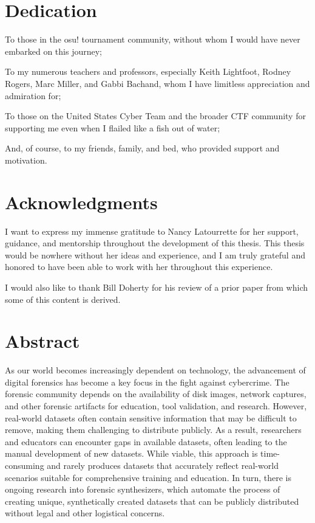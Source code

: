 \section{Dedication}\label{dedication}

To those in the osu! tournament community, without whom I would have
never embarked on this journey;

To my numerous teachers and professors, especially Keith Lightfoot,
Rodney Rogers, Marc Miller, and Gabbi Bachand, whom I have limitless
appreciation and admiration for;

To those on the United States Cyber Team and the broader CTF community
for supporting me even when I flailed like a fish out of water;

And, of course, to my friends, family, and bed, who provided support and
motivation.

\section{Acknowledgments}\label{acknowledgments}

I want to express my immense gratitude to Nancy Latourrette for her
support, guidance, and mentorship throughout the development of this
thesis. This thesis would be nowhere without her ideas and experience,
and I am truly grateful and honored to have been able to work with her
throughout this experience.

I would also like to thank Bill Doherty for his review of a prior paper
from which some of this content is derived.

\section{Abstract}\label{abstract}

As our world becomes increasingly dependent on technology, the
advancement of digital forensics has become a key focus in the fight
against cybercrime. The forensic community depends on the availability
of disk images, network captures, and other forensic artifacts for
education, tool validation, and research. However, real-world datasets
often contain sensitive information that may be difficult to remove,
making them challenging to distribute publicly. As a result, researchers
and educators can encounter gaps in available datasets, often leading to
the manual development of new datasets. While viable, this approach is
time-consuming and rarely produces datasets that accurately reflect
real-world scenarios suitable for comprehensive training and education.
In turn, there is ongoing research into forensic synthesizers, which
automate the process of creating unique, synthetically created datasets
that can be publicly distributed without legal and other logistical
concerns.

